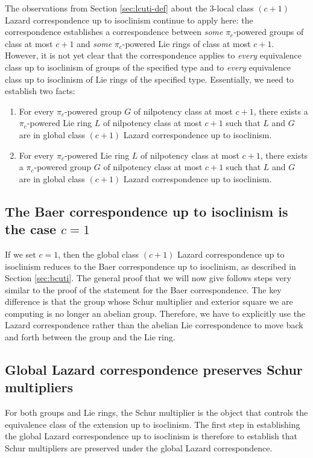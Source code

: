 \documentclass{ucetd}
\begin{document}
The observations from Section \ref{sec:lcuti-def} about the $3$-local
class $(c + 1)$ Lazard correspondence up to isoclinism continue to apply
here: the correspondence establishes a correspondence between {\em
  some} $\pi_c$-powered groups of class at most $c + 1$ and {\em some}
$\pi_c$-powered Lie rings of class at most $c + 1$. However, it is not yet clear that the
correspondence applies to {\em every} equivalence class up to
isoclinism of groups of the specified type and to {\em every}
equivalence class up to isoclinism of Lie rings of the specified
type. Essentially, we need to establish two facts:

\begin{enumerate}
\item For every $\pi_c$-powered group $G$ of nilpotency class at most $c
  + 1$, there exists a $\pi_c$-powered Lie ring $L$ of nilpotency class
  at most $c + 1$ such that $L$ and $G$ are in global class $(c + 1)$ Lazard
  correspondence up to isoclinism.
\item For every $\pi_c$-powered Lie ring $L$ of nilpotency class at most
  $c + 1$, there exists a $\pi_c$-powered group $G$ of nilpotency class
  at most $c + 1$ such that $L$ and $G$ are in global class $(c + 1)$ Lazard
  correspondence up to isoclinism.
\end{enumerate}

\subsection{The Baer correspondence up to isoclinism is the case $c = 1$}

If we set $c = 1$, then the global class $(c + 1)$ Lazard
correspondence up to isoclinism reduces to the Baer correspondence up
to isoclinism, as described in Section \ref{sec:bcuti}. The general
proof that we will now give follows steps very similar to the proof of
the statement for the Baer correspondence. The key difference is that
the group whose Schur multiplier and exterior square we are computing
is no longer an abelian group. Therefore, we have to explicitly use
the Lazard correspondence rather than the abelian Lie correspondence
to move back and forth between the group and the Lie ring.


\subsection{Global Lazard correspondence preserves Schur multipliers}

For both groups and Lie rings, the Schur multiplier is the object that
controls the equivalence class of the extension up to isoclinism. The
first step in establishing the global Lazard correspondence up to
isoclinism is therefore to establish that Schur multipliers are
preserved under the global Lazard correspondence.
\end{document}
